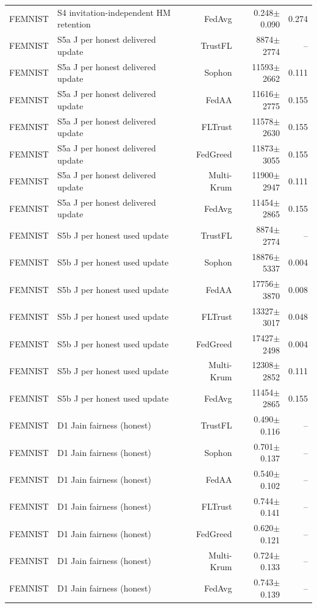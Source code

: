 \begin{tabular}{llrrr}
FEMNIST & S4 invitation-independent HM retention & FedAvg & 0.248$\pm$0.090 & 0.274 \\
FEMNIST & S5a J per honest delivered update & TrustFL & 8874$\pm$2774 & -- \\
FEMNIST & S5a J per honest delivered update & Sophon & 11593$\pm$2662 & 0.111 \\
FEMNIST & S5a J per honest delivered update & FedAA & 11616$\pm$2775 & 0.155 \\
FEMNIST & S5a J per honest delivered update & FLTrust & 11578$\pm$2630 & 0.155 \\
FEMNIST & S5a J per honest delivered update & FedGreed & 11873$\pm$3055 & 0.155 \\
FEMNIST & S5a J per honest delivered update & Multi-Krum & 11900$\pm$2947 & 0.111 \\
FEMNIST & S5a J per honest delivered update & FedAvg & 11454$\pm$2865 & 0.155 \\
FEMNIST & S5b J per honest used update & TrustFL & 8874$\pm$2774 & -- \\
FEMNIST & S5b J per honest used update & Sophon & 18876$\pm$5337 & 0.004 \\
FEMNIST & S5b J per honest used update & FedAA & 17756$\pm$3870 & 0.008 \\
FEMNIST & S5b J per honest used update & FLTrust & 13327$\pm$3017 & 0.048 \\
FEMNIST & S5b J per honest used update & FedGreed & 17427$\pm$2498 & 0.004 \\
FEMNIST & S5b J per honest used update & Multi-Krum & 12308$\pm$2852 & 0.111 \\
FEMNIST & S5b J per honest used update & FedAvg & 11454$\pm$2865 & 0.155 \\
FEMNIST & D1 Jain fairness (honest) & TrustFL & 0.490$\pm$0.116 & -- \\
FEMNIST & D1 Jain fairness (honest) & Sophon & 0.701$\pm$0.137 & -- \\
FEMNIST & D1 Jain fairness (honest) & FedAA & 0.540$\pm$0.102 & -- \\
FEMNIST & D1 Jain fairness (honest) & FLTrust & 0.744$\pm$0.141 & -- \\
FEMNIST & D1 Jain fairness (honest) & FedGreed & 0.620$\pm$0.121 & -- \\
FEMNIST & D1 Jain fairness (honest) & Multi-Krum & 0.724$\pm$0.133 & -- \\
FEMNIST & D1 Jain fairness (honest) & FedAvg & 0.743$\pm$0.139 & -- \\
\bottomrule
\end{tabular}
